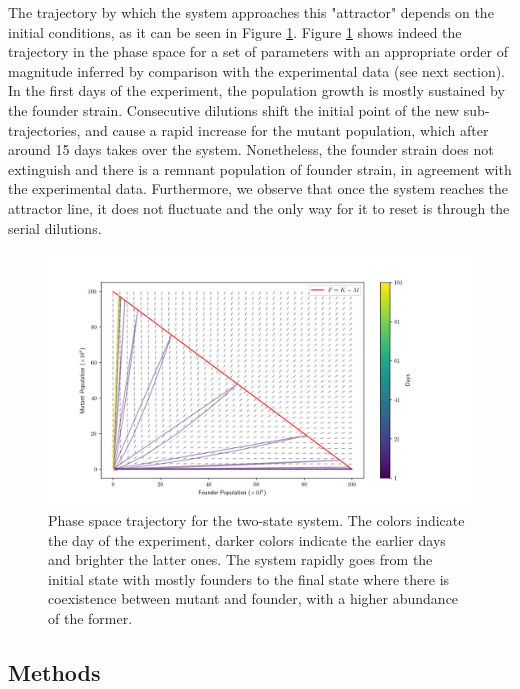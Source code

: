 \documentclass[10pt,a4paper]{scrartcl}
\begin{document}
The trajectory by which the system approaches this "attractor" depends on the initial conditions, as it can be seen in Figure \ref{fig:2st_vector_fiel_with_trajectory}. Figure \ref{fig:2st_vector_fiel_with_trajectory} shows indeed the trajectory in the phase space for a set of parameters with an appropriate order of magnitude inferred by comparison with the experimental data (see next section).  In the first days of the experiment,  the population growth is mostly sustained by the founder strain. Consecutive dilutions shift the initial point of the new sub-trajectories, and cause a rapid increase for the mutant population, which after around 15 days takes over the system. Nonetheless, the founder strain does not extinguish and there is a remnant population of founder strain, in agreement with the experimental data.
Furthermore, we observe that once the system reaches the attractor line, it does not fluctuate and the only way for it to reset is through the serial dilutions.

\begin{figure}[H]
    \centering
    \includegraphics[width=1\linewidth]{plots/vector field with trajectory.png}
    \caption{Phase space trajectory for the two-state system. The colors indicate the day of the experiment, darker colors indicate the earlier days and brighter the latter ones. The system rapidly goes from the initial state with mostly founders to the final state where there is coexistence between mutant and founder, with a higher abundance of the former.}
    \label{fig:2st_vector_fiel_with_trajectory}
\end{figure}


\subsection*{Methods}
\end{document}
